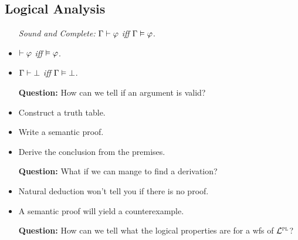 \documentclass[a4paper, 11pt]{article} %
\begin{document}
\begin{multicols}{2}
\section*{Logical Analysis}

\begin{itemize}
  \item[\it Sound and Complete:] $\Gamma \vdash \varphi$ \textit{iff} $\Gamma \vDash \varphi$.
    \item $\vdash \varphi$ \textit{iff} $\vDash \varphi$.
    \item $\Gamma \vdash \bot$ \textit{iff} $\Gamma \vDash \bot$. 
  \item[\bf Question:] How can we tell if an argument is valid? 
    \item Construct a truth table.
    \item Write a semantic proof.
    \item Derive the conclusion from the premises.
  \item[\bf Question:] What if we can mange to find a derivation?
    \item Natural deduction won't tell you if there is no proof.
    \item A semantic proof will yield a counterexample.
  \item[\bf Question:] How can we tell what the logical properties are for a wfs of $\mathcal{L}^{\textsc{pl}}$?
\end{itemize}




\end{multicols}
\end{document}
